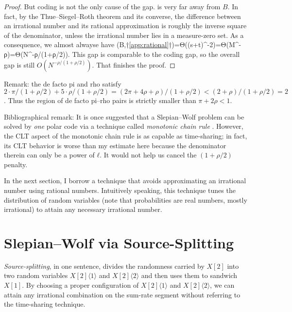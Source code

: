 \documentclass[openany]{amsbook}
\numberwithin{equation}{chapter}
\numberwithin{figure}{chapter}
\numberwithin{table}{chapter}
\DeclareMathOperator\dist{dist}
\def\[#1\]{\begin{equation*}{#1}\end{equation*}}
\theoremstyle{definition}	理dfn:Definition~?s			理exa:Example~?s
\theoremstyle{remark}		理cla:Claim~?s				理rem:Remark~?s
\begin{document}
\begin{proof}
		But coding is not the only cause of the gap.
		 is very far away from $B$.
		In fact, by the Thue--Siegel--Roth theorem and its converse,
		the difference between an irrational number and its rational approximation
		is roughly the inverse square of the denominator,
		unless the irrational number lies in a measure-zero set.
		As a consequence, we almost alwayse have
		\[\dist(B,†\cref{app:rational}†)=Θ((s+t)^{-2})=Θ(M^{-ρ})=Θ(N^{-ρ/(1+ρ/2)}).\]
		This gap is comparable to the coding gap,
		so the overall gap is still $O(N^{-ρ/(1+ρ/2)})$.
		That finishes the proof.
	\end{proof}
	
	Remark: the de facto pi and rho satisfy
	$2·π/(1+ρ/2)+5·ρ/(1+ρ/2)=(2π+4ρ+ρ)/(1+ρ/2)<(2+ρ)/(1+ρ/2)=2$.
	Thus the region of de facto pi--rho pairs is strictly smaller than $π+2ρ<1$.
	
	Bibliographical remark:
	It is once suggested that a Slepian--Wolf problem can be solved by \emph{one}
	polar code via a technique called \emph{monotonic chain rule} \cite{Arikan12}.
	However, the CLT aspect of the monotonic chain rule is as capable as time-sharing;
	in fact, its CLT behavior is worse than my estimate here
	because the denominator therein can only be a power of $ℓ$.
	It would not help us cancel the $(1+ρ/2)$ penalty.
	
	In the next section, I borrow a technique that avoids
	approximating an irrational number using rational numbers.
	Intuitively speaking, this technique tunes the distribution of random variables
	(note that probabilities are real numbers, mostly irrational)
	to attain any necessary irrational number.


\section{Slepian--Wolf via Source-Splitting}

	\emph{Source-splitting}, in one sentence, divides the randomness
	carried by $X[2]$ into two random variables $X[2]⟨1⟩$ and $X[2]⟨2⟩$
	and then uses them to sandwich $X[1]$.
	By choosing a proper configuration of $X[2]⟨1⟩$ and $X[2]⟨2⟩$,
	we can attain any irrational combination on the sum-rate segment
	without referring to the time-sharing technique.
	
\end{document}
